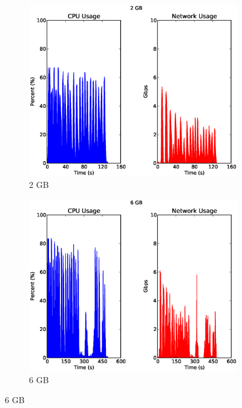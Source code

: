 \documentclass[a4paper,12pt,twoside,openright]{report}
\begin{document}
\begin{figure}[h!]
        \begin{subfigure}[b]{0.33\textwidth}
                \centering
                \includegraphics[width=\textwidth]{kmeans32.csv.eps}
                \caption{2 GB}
                \label{fig:2GBkmeansres}
        \end{subfigure}%
        \begin{subfigure}[b]{0.33\textwidth}
                \centering
                \includegraphics[width=\textwidth]{kmeans96.csv.eps}
                \caption{6 GB}

\end{subfigure}
\end{figure}
\end{document}

